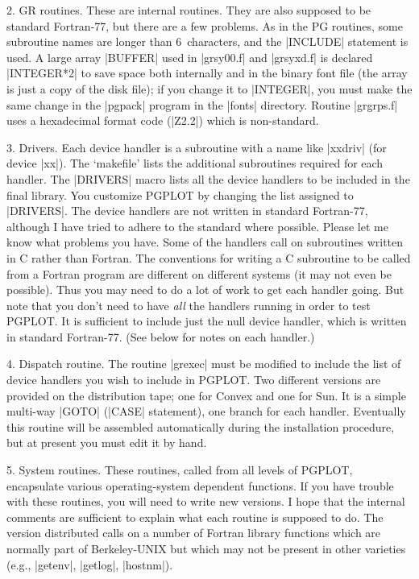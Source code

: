\item{2.} GR routines.  These are internal routines. They are also 
supposed to be standard Fortran-77, but there are a few problems.
As in the PG routines, some subroutine names are longer than 
6~characters, and the |INCLUDE| statement is used. A large array
|BUFFER| used in |grsy00.f| and |grsyxd.f| is declared |INTEGER*2| to save 
space both internally and in the binary font file (the array is just
a copy of the disk file); if you change it to |INTEGER|, you must make
the same change in the |pgpack| program in the |fonts| directory.
Routine |grgrps.f| uses a hexadecimal format code (|Z2.2|) which is
non-standard.

\item{3.} Drivers.  Each device handler is a subroutine with a name
like |xxdriv| (for device |xx|). The `makefile' lists the additional
subroutines required for each handler. The |DRIVERS| macro lists all
the device handlers to be included in the final library. You customize 
PGPLOT by changing the list assigned to |DRIVERS|.  The device handlers
are not written in standard Fortran-77, although I have tried to adhere 
to the standard where possible.  Please let me know what problems you 
have.  Some of the handlers call on subroutines written in C rather than 
Fortran. The conventions for writing a C subroutine to be called from a 
Fortran program are different on different systems (it may not even be 
possible). Thus you may need to do a lot of work to get each handler
going. But note that you don't need to have {\it all\/} the handlers
running in order to test PGPLOT.  It is sufficient to include just the
null device handler, which is written in standard Fortran-77. (See below 
for notes on each handler.)

\item{4.} Dispatch routine. The routine |grexec| must be modified to 
include the list of device handlers you wish to include in PGPLOT.
Two different versions are provided on the distribution tape; one for 
Convex and one for Sun.
It is a simple multi-way |GOTO| (|CASE| statement), one branch for
each handler. Eventually this routine will be assembled automatically 
during the installation procedure, but at present you must edit it by 
hand.

\item{5.} System routines. These routines, called from all levels of 
PGPLOT, encapsulate various operating-system dependent functions.
If you have trouble with these routines, you will need to write new
versions. I hope that the internal comments are sufficient to explain 
what each routine is supposed to do.  The version distributed calls
on a number of Fortran library functions which are normally part of 
Berkeley-UNIX but which may not be present in other varieties (e.g.,
|getenv|, |getlog|, |hostnm|).

